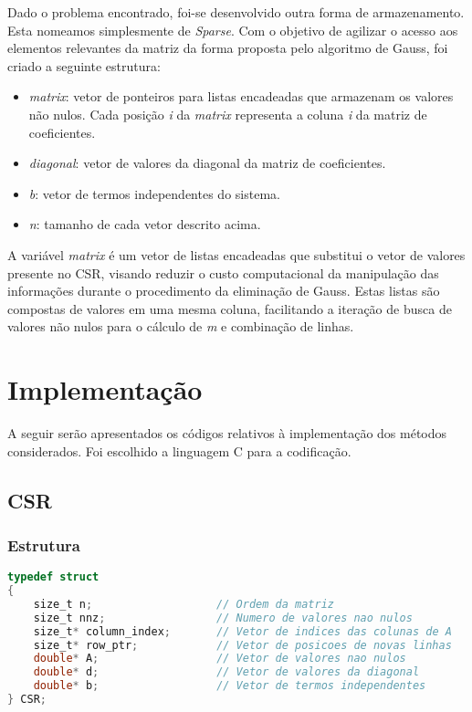\documentclass[
	article,			%
	11pt,				%
	oneside,			%
	a4paper,			%
	english,			%
	brazil,				%
	sumario=tradicional
	]{abntex2}
\begin{document}
Dado o problema encontrado, foi-se desenvolvido outra forma de armazenamento. Esta nomeamos simplesmente de \textit{Sparse}. Com o objetivo de agilizar o acesso aos elementos relevantes da matriz da forma proposta pelo algoritmo de Gauss, foi criado a seguinte estrutura:

\begin{itemize}
  \item \textit{matrix}: vetor de ponteiros para listas encadeadas que armazenam os valores não nulos. Cada posição \textit{i} da \textit{matrix} representa a coluna \textit{i} da matriz de coeficientes.
  \item \textit{diagonal}: vetor de valores da diagonal da matriz de coeficientes.
  \item \textit{b}: vetor de termos independentes do sistema.
  \item \textit{n}: tamanho de cada vetor descrito acima.
\end{itemize}

A variável \textit{matrix} é um vetor de listas encadeadas que substitui o vetor de valores presente no CSR, visando reduzir o custo computacional da manipulação das informações durante o procedimento da eliminação de Gauss. Estas listas são compostas de valores em uma mesma coluna, facilitando a iteração de busca de valores não nulos para o cálculo de \textit{m} e combinação de linhas.

\section{Implementação}
A seguir serão apresentados os códigos relativos à implementação dos métodos considerados. Foi escolhido a linguagem C para a codificação.

\subsection{CSR}

\subsubsection{Estrutura}
\begin{lstlisting}[language=C, caption=Estrutura da CSR]
typedef struct 
{
    size_t n;					// Ordem da matriz
    size_t nnz;					// Numero de valores nao nulos
    size_t* column_index;		// Vetor de indices das colunas de A
    size_t* row_ptr;			// Vetor de posicoes de novas linhas
    double* A;					// Vetor de valores nao nulos
    double* d;					// Vetor de valores da diagonal
    double* b;					// Vetor de termos independentes
} CSR;
\end{lstlisting}
\end{document}
